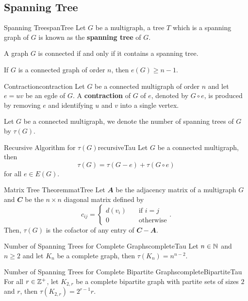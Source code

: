 \documentclass[math]{amznotes}
\theoremstyle{remark}
\begin{document}
\subsection{Spanning Tree}
\begin{dfnbox}{Spanning Tree}{spanTree}
    Let $G$ be a multigraph, a tree $T$ which is a spanning graph of $G$ is known as the {\color{red} \textbf{spanning tree}} of $G$.
\end{dfnbox}
\begin{probox}{}{}
    A graph $G$ is connected if and only if it contains a spanning tree.
\end{probox}
\begin{corbox}{}{}
    If $G$ is a connected graph of order $n$, then $e(G) \geq n - 1$.
\end{corbox}
\begin{dfnbox}{Contraction}{contraction}
    Let $G$ be a connected multigraph of order $n$ and let $e = uv$ be an egde of $G$. A {\color{red} \textbf{contraction}} of $G$ of $e$, denoted by $G \circ e$, is produced by removing $e$ and identifying $u$ and $v$ into a single vertex.
\end{dfnbox}
Let $G$ be a connected multigraph, we denote the number of spanning trees of $G$ by $\tau(G)$.
\begin{thmbox}{Recursive Algorithm for $\tau(G)$}{recursiveTau}
    Let $G$ be a connected multigraph, then
    \begin{equation*}
        \tau(G) = \tau(G - e) + \tau(G \circ e)
    \end{equation*}
    for all $e \in E(G)$.
\end{thmbox}
\begin{thmbox}{Matrix Tree Theorem}{matTree}
    Let $\mathbfit{A}$ be the adjacency matrix of a multigraph $G$ and $\mathbfit{C}$ be the $n \times n$ diagonal matrix defined by
    \begin{equation*}
        c_{ij} = \begin{cases}
            d(v_i) & \quad\textrm{if } i = j \\
            0 & \quad\textrm{otherwise}
        \end{cases}.
    \end{equation*}
    Then, $\tau(G)$ is the cofactor of any entry of $\mathbfit{C - A}$. 
\end{thmbox}
\begin{thmbox}{Number of Spanning Trees for Complete Graphs}{completeTau}
    Let $n \in \mathbb{N}$ and $n \geq 2$ and let $K_n$ be a complete graph, then $\tau(K_n) = n^{n - 2}$.
\end{thmbox}
\begin{thmbox}{Number of Spanning Trees for Complete Bipartite Graphs}{completeBipartiteTau}
    For all $r \in \mathbb{Z}^+$, let $K_{2, r}$ be a complete bipartite graph with partite sets of sizes $2$ and $r$, then $\tau\left(K_{2, r}\right) = 2^{r - 1}r$.
\end{thmbox}
\end{document}
